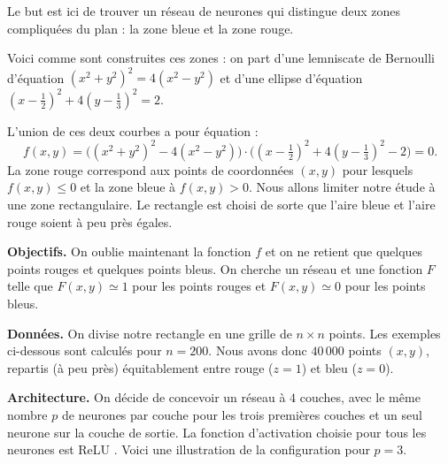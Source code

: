 {Le but est ici de trouver un réseau de neurones qui distingue deux zones compliquées du plan : la zone bleue et la zone rouge.




Voici comme sont construites ces zones : on part d'une lemniscate de Bernoulli d'équation $(x^2+y^2)^2 = 4(x^2-y^2)$ et d'une ellipse d'équation
$(x-\frac12)^2 + 4(y-\frac13)^2=2$. 

\begin{center}
	\begin{minipage}{0.31\textwidth}
	\end{minipage}
	\quad
	\begin{minipage}{0.31\textwidth}
		
	\end{minipage}
	\quad
	\begin{minipage}{0.31\textwidth}
	\end{minipage}
\end{center}


L'union de ces deux courbes a pour équation :
$$f(x,y) = \big( (x^2+y^2)^2 - 4(x^2-y^2) \big)  \cdot \big((x-\tfrac12)^2 + 4(y-\tfrac13)^2 - 2 \big) = 0.$$
La zone rouge correspond aux points de coordonnées $(x,y)$ pour lesquels $f(x,y) \le 0$ et la zone bleue à $f(x,y) > 0$. Nous allons limiter notre étude à une zone rectangulaire. Le rectangle est choisi de sorte que l'aire bleue et l'aire rouge soient à peu près égales.

\textbf{Objectifs.} 
On oublie maintenant la fonction $f$ et on ne retient que quelques points rouges et quelques points bleus. On cherche un réseau et une fonction $F$ telle que $F(x,y) \simeq 1$ pour les points rouges et $F(x,y) \simeq 0$ pour les points bleus.

\textbf{Données.} 
On divise notre rectangle en une grille de $n \times n$ points. Les exemples ci-dessous sont calculés pour $n=200$. Nous avons donc $40\,000$ points $(x,y)$, repartis (à peu près) équitablement entre rouge ($z=1$) et bleu ($z=0$).

\textbf{Architecture.}
On décide de concevoir un réseau à $4$ couches, avec le même nombre $p$ de neurones par couche pour les trois premières couches et un seul neurone sur la couche de sortie. La fonction d'activation choisie pour tous les neurones est ReLU .
Voici une illustration de la configuration pour $p=3$.

}
